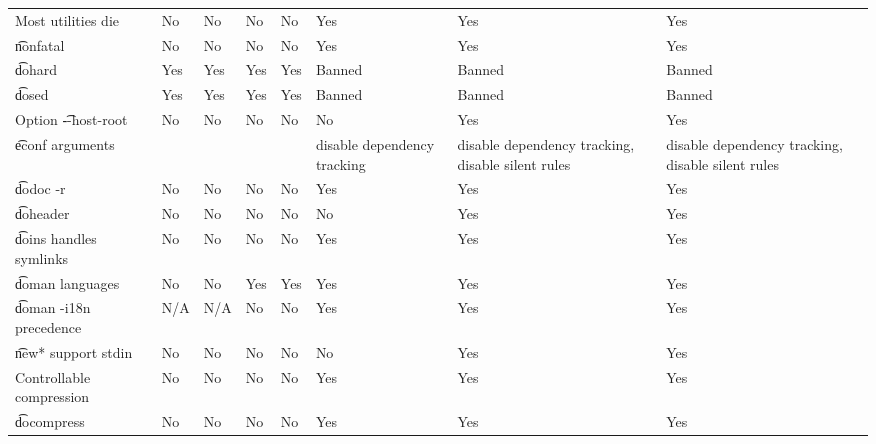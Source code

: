 \begin{landscape}
\begin{longtable}{llP{5em}P{5em}P{6em}P{6em}P{6em}P{6em}P{6em}}
Most utilities die &  &
    No & No & No & No & Yes & Yes & Yes \\

\t{nonfatal} &  &
    No & No & No & No & Yes & Yes & Yes \\

\t{dohard} &  &
    Yes & Yes & Yes & Yes & Banned & Banned & Banned \\

\t{dosed} &  &
    Yes & Yes & Yes & Yes & Banned & Banned & Banned \\

Option \t{-{}-host-root} &  &
    No & No & No & No & No & Yes & Yes \\

\t{econf} arguments &  &
    &  &  &  & disable dependency tracking &
    disable dependency tracking, disable silent rules &
    disable dependency tracking, disable silent rules \\

\t{dodoc -r} &  &
    No & No & No & No & Yes & Yes & Yes \\

\t{doheader} &  &
    No & No & No & No & No & Yes & Yes \\

\t{doins} handles symlinks &  &
    No & No & No & No & Yes & Yes & Yes \\

\t{doman} languages &  &
    No & No & Yes & Yes & Yes & Yes & Yes \\

\t{doman -i18n} precedence &  &
    N/A & N/A & No & No & Yes & Yes & Yes \\

\t{new*} support stdin &  &
    No & No & No & No & No & Yes & Yes \\

Controllable compression &  &
    No & No & No & No & Yes & Yes & Yes \\

\t{docompress} &  &
    No & No & No & No & Yes & Yes & Yes \\


\end{longtable}
\end{landscape}
